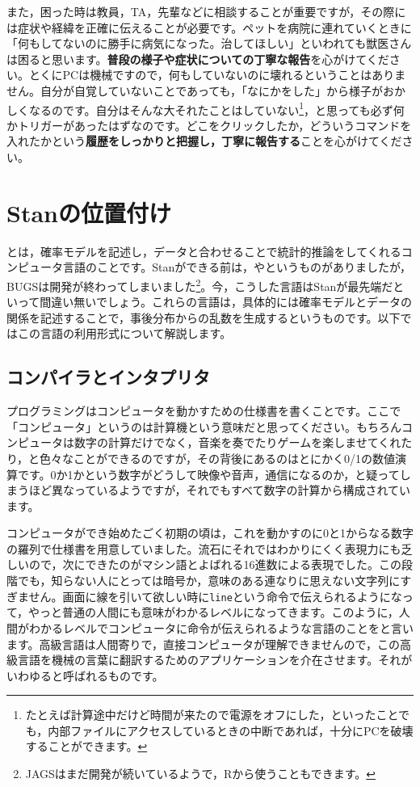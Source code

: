 \documentclass{ltjsbook}
\begin{document}
また，困った時は教員，TA，先輩などに相談することが重要ですが，その際には症状や経緯を正確に伝えることが必要です。ペットを病院に連れていくときに「何もしてないのに勝手に病気になった。治してほしい」といわれても獣医さんは困ると思います。\textbf{普段の様子や症状についての丁寧な報告}を心がけてください。とくにPCは機械ですので，何もしていないのに壊れるということはありません。自分が自覚していないことであっても，「なにかをした」から様子がおかしくなるのです。自分はそんな大それたことはしていない\footnote{たとえば計算途中だけど時間が来たので電源をオフにした，といったことでも，内部ファイルにアクセスしているときの中断であれば，十分にPCを破壊することができます。}，と思っても必ず何かトリガーがあったはずなのです。どこをクリックしたか，どういうコマンドを入れたかという\textbf{履歴をしっかりと把握し，丁寧に報告する}ことを心がけてください。

\section{Stanの位置付け}

とは，確率モデルを記述し，データと合わせることで統計的推論をしてくれるコンピュータ言語のことです。Stanができる前は，やというものがありましたが，BUGSは開発が終わってしまいました\footnote{JAGSはまだ開発が続いているようで，Rから使うこともできます。}。今，こうした言語はStanが最先端だといって間違い無いでしょう。これらの言語は，具体的には確率モデルとデータの関係を記述することで，事後分布からの乱数を生成するというものです。以下ではこの言語の利用形式について解説します。

\subsection{コンパイラとインタプリタ}

プログラミングはコンピュータを動かすための仕様書を書くことです。ここで「コンピュータ」というのは計算機という意味だと思ってください。もちろんコンピュータは数字の計算だけでなく，音楽を奏でたりゲームを楽しませてくれたり，と色々なことができるのですが，その背後にあるのはとにかく0/1の数値演算です。0か1かという数字がどうして映像や音声，通信になるのか，と疑ってしまうほど異なっているようですが，それでもすべて数字の計算から構成されています。

コンピュータができ始めたごく初期の頃は，これを動かすのに0と1からなる数字の羅列で仕様書を用意していました。流石にそれではわかりにくく表現力にも乏しいので，次にできたのがマシン語とよばれる16進数による表現でした。この段階でも，知らない人にとっては暗号か，意味のある連なりに思えない文字列にすぎません。画面に線を引いて欲しい時に\texttt{line}という命令で伝えられるようになって，やっと普通の人間にも意味がわかるレベルになってきます。このように，人間がわかるレベルでコンピュータに命令が伝えられるような言語のことをと言います。高級言語は人間寄りで，直接コンピュータが理解できませんので，この高級言語を機械の言葉に翻訳するためのアプリケーションを介在させます。それがいわゆると呼ばれるものです。
\end{document}

